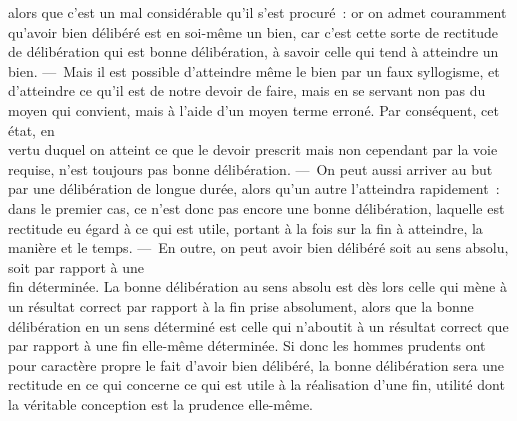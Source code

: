 \documentclass[french,twoside]{book} %
\begin{document}
alors que c’est un mal considérable qu’il s’est procuré : or on admet couramment qu’avoir bien délibéré est en soi-même un bien, car c’est cette sorte de rectitude de délibération qui est bonne délibération, à savoir celle qui tend à atteindre un bien. — Mais il est possible d’atteindre même le bien par un faux syllogisme, et d’atteindre ce qu’il est de notre devoir de faire, mais en se servant non pas du moyen qui convient, mais à l’aide d’un moyen terme erroné. Par conséquent, cet état, en \\
vertu duquel on atteint ce que le devoir prescrit mais non cependant par la voie requise, n’est toujours pas bonne délibération. — On peut aussi arriver au but par une délibération de longue durée, alors qu’un autre l’atteindra rapidement : dans le premier cas, ce n’est donc pas encore une bonne délibération, laquelle est rectitude eu égard à ce qui est utile, portant à la fois sur la fin à atteindre, la manière et le temps. — En outre, on peut avoir bien délibéré soit au sens absolu, soit par rapport à une \\
fin déterminée. La bonne délibération au sens absolu est dès lors celle qui mène à un résultat correct par rapport à la fin prise absolument, alors que la bonne délibération en un sens déterminé est celle qui n’aboutit à un résultat correct que par rapport à une fin elle-même déterminée. Si donc les hommes prudents ont pour caractère propre le fait d’avoir bien délibéré, la bonne délibération sera une rectitude en ce qui concerne ce qui est utile à la réalisation d’une fin, utilité dont la véritable conception est la prudence elle-même.
\end{document}
